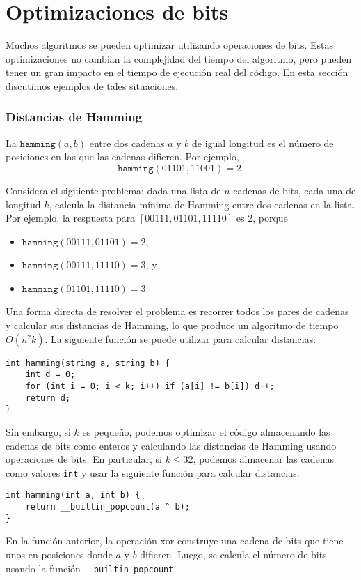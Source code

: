 \section{Optimizaciones de bits}

Muchos algoritmos se pueden optimizar utilizando
operaciones de bits.
Estas optimizaciones no cambian la
complejidad del tiempo del algoritmo,
pero pueden tener un gran impacto
en el tiempo de ejecución real del código.
En esta sección discutimos ejemplos
de tales situaciones.

\subsubsection{Distancias de Hamming}

La 
$\texttt{hamming}(a,b)$ entre dos
cadenas $a$ y $b$ de igual longitud es
el número de posiciones en las que las cadenas difieren.
Por ejemplo,
\[\texttt{hamming}(01101,11001)=2.\]

Considera el siguiente problema: dada
una lista de $n$ cadenas de bits, cada una de longitud $k$,
calcula la distancia mínima de Hamming
entre dos cadenas en la lista.
Por ejemplo, la respuesta para $[00111,01101,11110]$
es 2, porque
\begin{itemize}[noitemsep]
    \item $\texttt{hamming}(00111,01101)=2$,
    \item $\texttt{hamming}(00111,11110)=3$, y
    \item $\texttt{hamming}(01101,11110)=3$.
\end{itemize}

Una forma directa de resolver el problema es
recorrer todos los pares de cadenas y calcular
sus distancias de Hamming,
lo que produce un algoritmo de tiempo $O(n^2 k)$.
La siguiente función se puede utilizar para
calcular distancias:
\begin{lstlisting}
int hamming(string a, string b) {
    int d = 0;
    for (int i = 0; i < k; i++) if (a[i] != b[i]) d++;
    return d;
}
\end{lstlisting}

Sin embargo, si $k$ es pequeño, podemos optimizar el código
almacenando las cadenas de bits como enteros y
calculando las distancias de Hamming usando operaciones de bits.
En particular, si $k \le 32$, podemos almacenar
las cadenas como valores \texttt{int} y usar la
siguiente función para calcular distancias:
\begin{lstlisting}
int hamming(int a, int b) {
    return __builtin_popcount(a ^ b);
}
\end{lstlisting}
En la función anterior, la operación xor construye
una cadena de bits que tiene unos en posiciones
donde $a$ y $b$ difieren.
Luego, se calcula el número de bits usando
la función \texttt{\_\_builtin\_popcount}.

